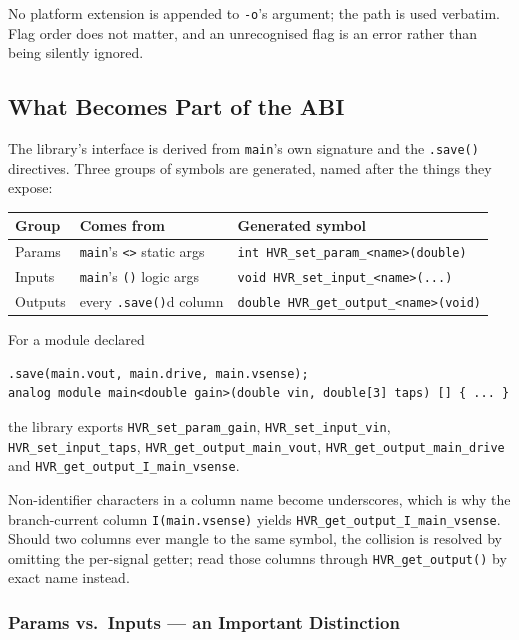 \documentclass[11pt, a4paper]{article}
\newcommand{\code}[1]{\texttt{\small #1}}
\begin{document}
No platform extension is appended to \code{-o}'s argument; the path is used
verbatim. Flag order does not matter, and an unrecognised flag is an error
rather than being silently ignored.

\subsection{What Becomes Part of the ABI}

The library's interface is derived from \code{main}'s own signature and the
\code{.save()} directives. Three groups of symbols are generated, named after
the things they expose:

\begin{center}
\begin{tabular}{@{} L{2.6cm} L{4.2cm} L{6.2cm} @{}}
  \toprule
  \textbf{Group} & \textbf{Comes from} & \textbf{Generated symbol} \\
  \midrule
  Params  & \code{main}'s \code{<>} static args &
    \code{int HVR\_set\_param\_<name>(double)} \\
  Inputs  & \code{main}'s \code{()} logic args &
    \code{void HVR\_set\_input\_<name>(...)} \\
  Outputs & every \code{.save()}d column &
    \code{double HVR\_get\_output\_<name>(void)} \\
  \bottomrule
\end{tabular}
\end{center}

\noindent For a module declared

\begin{lstlisting}
.save(main.vout, main.drive, main.vsense);
analog module main<double gain>(double vin, double[3] taps) [] { ... }
\end{lstlisting}

\noindent the library exports \code{HVR\_set\_param\_gain},
\code{HVR\_set\_input\_vin}, \code{HVR\_set\_input\_taps},
\code{HVR\_get\_output\_main\_vout}, \code{HVR\_get\_output\_main\_drive} and
\code{HVR\_get\_output\_I\_main\_vsense}.

Non-identifier characters in a column name become underscores, which is why
the branch-current column \code{I(main.vsense)} yields
\code{HVR\_get\_output\_I\_main\_vsense}. Should two columns ever mangle to the
same symbol, the collision is resolved by omitting the per-signal getter; read
those columns through \code{HVR\_get\_output()} by exact name instead.

\subsubsection{Params vs.\ Inputs --- an Important Distinction}
\end{document}

